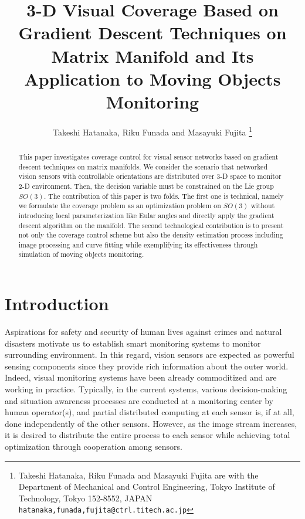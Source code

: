 \documentclass[conference,letterpaper]{ieeeconf}
\title{3-D Visual Coverage Based on
Gradient Descent Techniques on Matrix Manifold
and Its Application to Moving Objects Monitoring}
\author{Takeshi Hatanaka, Riku Funada and Masayuki Fujita
\thanks{Takeshi Hatanaka, Riku Funada and Masayuki Fujita are with the Department of Mechanical and 
Control Engineering, Tokyo Institute of Technology, Tokyo 152-8552, JAPAN
        {\tt\small {hatanaka,funada,fujita}@ctrl.titech.ac.jp}}}
\begin{document}
\maketitle
\thispagestyle{empty}
\pagestyle{empty}

\begin{abstract}
This paper investigates coverage control 
for visual sensor networks based on gradient descent
techniques on matrix manifolds.
We consider the scenario 
that networked vision sensors with controllable orientations
are distributed over 3-D space to 
monitor 2-D environment.
Then, the decision variable must be constrained
on the Lie group $SO(3)$.
The contribution of this paper is two folds.
The first one is technical, namely we formulate the coverage problem as an optimization
problem on $SO(3)$ without introducing local parameterization like
Eular angles and directly apply the gradient descent algorithm on 
the manifold.
The second technological contribution is to 
present not only the coverage control scheme but
also the density estimation process including image processing
and curve fitting while exemplifying its effectiveness 
through simulation of moving objects monitoring.
\end{abstract}




\section{Introduction}



Aspirations for safety and security of human lives against 
crimes and natural disasters 
motivate us to establish smart monitoring systems 
to monitor surrounding environment.
In this regard, vision sensors are expected as powerful 
sensing components since they
provide rich information about the outer world. 
Indeed, visual monitoring systems have been already
commoditized and are working in practice.
Typically, in the current systems, 
various decision-making and situation awareness processes 
are conducted at a monitoring center by human operator(s),
and partial distributed computing at each sensor is, if at all, done 
independently of the other sensors.
However, as the image stream increases, 
it is desired to distribute the entire process
to each sensor while achieving total optimization
through cooperation among sensors.
\end{document}
